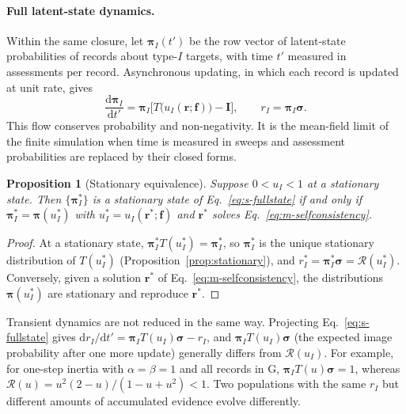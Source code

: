 \documentclass[fleqn,10pt]{wlscirep}
\newcommand{\Rmap}{\mathscr{R}}            %
\newcommand{\dd}{\mathrm{d}}
\theoremstyle{plain}
\newtheorem{proposition}[lemma]{Proposition}
\begin{document}
\paragraph{Full latent-state dynamics.} Within the same closure, let $\bm\pi_I(t')$ be the row vector of latent-state probabilities of records about type-$I$ targets, with time $t'$ measured in assessments per record. Asynchronous updating, in which each record is updated at unit rate, gives
\begin{equation}
\frac{\dd\bm\pi_I}{\dd t'}=\bm\pi_I\bigl[T\bigl(u_I(\bm r;\bm f)\bigr)-\mathbf I\bigr],\qquad r_I=\bm\pi_I\bm\sigma.
\label{eq:s-fullstate}
\end{equation}
This flow conserves probability and non-negativity. It is the mean-field limit of the finite simulation when time is measured in sweeps and assessment probabilities are replaced by their closed forms.

\begin{proposition}[Stationary equivalence]\label{prop:equivalence}
Suppose $0<u_I<1$ at a stationary state. Then $\{\bm\pi^*_I\}$ is a stationary state of Eq.~\eqref{eq:s-fullstate} if and only if $\bm\pi^*_I=\bm\pi(u^*_I)$ with $u^*_I=u_I(\bm r^*;\bm f)$ and $\bm r^*$ solves Eq.~\eqref{eq:m-selfconsistency}.
\end{proposition}
\begin{proof}
At a stationary state, $\bm\pi^*_IT(u^*_I)=\bm\pi^*_I$, so $\bm\pi^*_I$ is the unique stationary distribution of $T(u^*_I)$ (Proposition~\ref{prop:stationary}), and $r^*_I=\bm\pi^*_I\bm\sigma=\Rmap(u^*_I)$. Conversely, given a solution $\bm r^*$ of Eq.~\eqref{eq:m-selfconsistency}, the distributions $\bm\pi(u^*_I)$ are stationary and reproduce $\bm r^*$.
\end{proof}

Transient dynamics are not reduced in the same way. Projecting Eq.~\eqref{eq:s-fullstate} gives $\dd r_I/\dd t'=\bm\pi_IT(u_I)\bm\sigma-r_I$, and $\bm\pi_IT(u_I)\bm\sigma$ (the expected image probability after one more update) generally differs from $\Rmap(u_I)$. For example, for one-step inertia with $\alpha=\beta=1$ and all records in G, $\bm\pi_IT(u)\bm\sigma=1$, whereas $\Rmap(u)=u^2(2-u)/(1-u+u^2)<1$. Two populations with the same $r_I$ but different amounts of accumulated evidence evolve differently.
\end{document}
